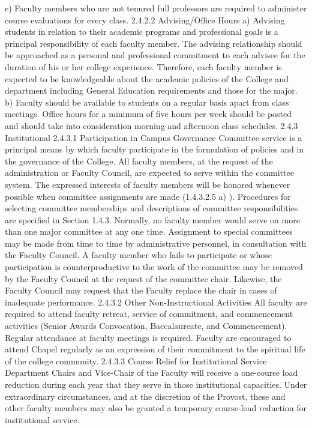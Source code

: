 \documentclass[letterpaper, 11pt]{article}
\begin{document}
	e) Faculty members who are not tenured full professors are required to administer course evaluations for every class.
	2.4.2.2 Advising/Office Hours
	a) Advising students in relation to their academic programs and professional goals is a principal responsibility of each faculty member.  The advising relationship should be approached as a personal and professional commitment to each advisee for the duration of his or her college experience.  Therefore, each faculty member is expected to be knowledgeable about the academic policies of the College and department including General Education requirements and those for the major.
	b) Faculty should be available to students on a regular basis apart from class meetings. Office hours for a minimum of five hours per week should be posted and should take into consideration morning and afternoon class schedules.
	2.4.3 Institutional
	2.4.3.1 Participation in Campus Governance
	Committee service is a principal means by which faculty participate in the formulation of policies and in the governance of the College.  All faculty members, at the request of the administration or Faculty Council, are expected to serve within the committee system.  The expressed interests of faculty members will be honored whenever possible when committee assignments are made (1.4.3.2.5 a) ).  Procedures for selecting committee memberships and descriptions of committee responsibilities are specified in Section 1.4.3.  Normally, no faculty member would serve on more than one major committee at any one time.  Assignment to special committees may be made from time to time by administrative personnel, in consultation with the Faculty Council.  A faculty member who fails to participate or whose participation is counterproductive to the work of the committee may be removed by the Faculty Council at the request of the committee chair.  Likewise, the Faculty Council may request that the Faculty replace the chair in cases of inadequate performance.
	2.4.3.2 Other Non-Instructional Activities
	All faculty are required to attend faculty retreat, service of commitment, and commencement activities (Senior Awards Convocation, Baccalaureate, and Commencement).  Regular attendance at faculty meetings is required.  Faculty are encouraged to attend Chapel regularly as an expression of their commitment to the spiritual life of the college community.
	2.4.3.3 Course Relief for Institutional Service
	Department Chairs and Vice-Chair of the Faculty will receive a one-course load reduction during each year that they serve in those institutional capacities.  Under extraordinary circumstances, and at the discretion of the Provost, these and other faculty members may also be granted a temporary course-load reduction for institutional service.
\end{document}
